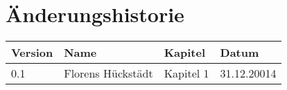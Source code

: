 %
%

\noindent
\chapter*{Änderungshistorie}
\begin{tabularx}{\textwidth}{|l|X|l|l|} \hline
       \textbf{Version}  	& \textbf{Name}   	& \textbf{Kapitel}  & \textbf{Datum}\\ \hline
       0.1           		& Florens Hückstädt & Kapitel 1 		& 31.12.20014\\
        \hline
\end{tabularx}